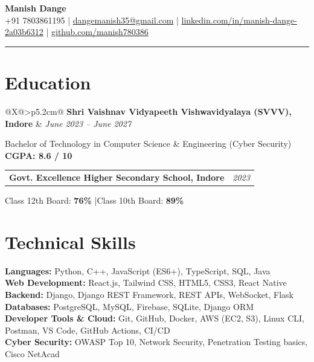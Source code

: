 \documentclass[10pt, a4paper]{article}
\makeatletter
\newcommand{\entrytwo}[2]{%
  \noindent
  \begin{tabularx}{\linewidth}{@{}X@{\hspace{4pt}}>{\raggedleft\arraybackslash}p{5.2cm}@{}}
    #1 & \textit{#2}
  \end{tabularx}%
}
\makeatother
\begin{document}
\begin{center}
  {\fontsize{18}{21}\selectfont\bfseries Manish Dange}\\[2pt]
  \small
  +91 7803861195 \;|\;
  \href{mailto:dangemanish35@gmail.com}{dangemanish35@gmail.com} \;|\;
  \href{https://linkedin.com/in/manish-dange-2a03b6312}{linkedin.com/in/manish-dange-2a03b6312} \;|\;
  \href{https://github.com/manish780386}{github.com/manish780386}
\end{center}

\vspace{-4pt}
\rule{\linewidth}{0.8pt}
\vspace{1pt}

\section*{Education}

\entrytwo{\textbf{Shri Vaishnav Vidyapeeth Vishwavidyalaya (SVVV), Indore}}{June 2023 -- June 2027}


Bachelor of Technology in Computer Science \& Engineering (Cyber Security) \hfill \textbf{CGPA: 8.6 / 10}

\vspace{4pt}

\entrytwo{\textbf{Govt. Excellence Higher Secondary School, Indore}}{2023}


Class 12th Board: \textbf{76\%} \quad|\quad Class 10th Board: \textbf{89\%}

\section*{Technical Skills}

\textbf{Languages:} Python, C++, JavaScript (ES6+), TypeScript, SQL, Java\\
\textbf{Web Development:} React.js, Tailwind CSS, HTML5, CSS3, React Native\\
\textbf{Backend:} Django, Django REST Framework, REST APIs, WebSocket, Flask\\
\textbf{Databases:} PostgreSQL, MySQL, Firebase, SQLite, Django ORM\\
\textbf{Developer Tools \& Cloud:} Git, GitHub, Docker, AWS (EC2, S3), Linux CLI, Postman, VS Code, GitHub Actions, CI/CD\\
\textbf{Cyber Security:} OWASP Top 10, Network Security, Penetration Testing basics, Cisco NetAcad
\end{document}
